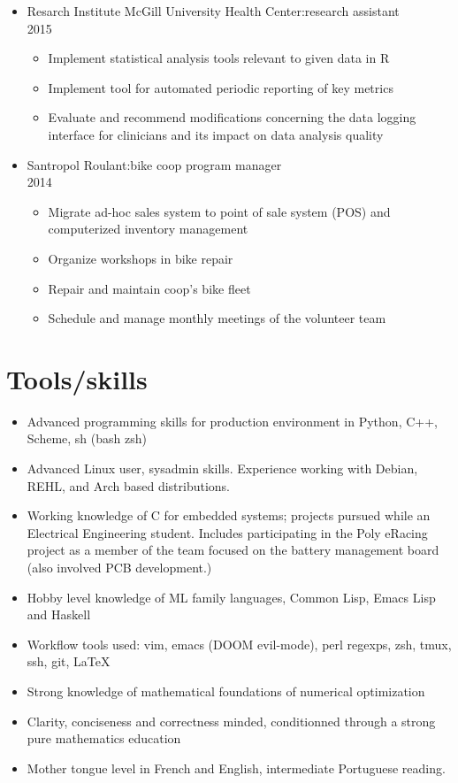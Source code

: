 \documentclass{article}
\begin{document}
\begin{itemize}
  \item Resarch Institute McGill University Health Center:\@ research assistant\\ 2015
    \begin{itemize}
      \item Implement statistical analysis tools relevant to given data in R
      \item Implement tool for automated periodic reporting of key metrics
      \item Evaluate and recommend modifications concerning the data logging
        interface for clinicians and its impact on data analysis quality
    \end{itemize}

  \item Santropol Roulant:\@ bike coop program manager\\ 2014
    \begin{itemize}
      \item Migrate ad-hoc sales system to point of sale system (POS) and computerized inventory management
      \item Organize workshops in bike repair
      \item Repair and maintain coop's bike fleet
      \item Schedule and manage monthly meetings of the volunteer team
    \end{itemize}

\end{itemize}

\section*{Tools/skills}
\begin{itemize}
  \item Advanced programming skills for production environment in Python, C++, Scheme, sh (bash zsh)
  \item Advanced Linux user, sysadmin skills.  Experience working with Debian, REHL, and Arch based distributions.
  \item Working knowledge of C for embedded systems; projects pursued while an Electrical Engineering student. Includes participating in the Poly eRacing project as a member of the team focused on the battery management board (also involved PCB development.)
  \item Hobby level knowledge of ML family languages, Common Lisp, Emacs Lisp and Haskell
  \item Workflow tools used: vim, emacs (DOOM evil-mode), perl regexps, zsh, tmux, ssh, git, \LaTeX
  \item Strong knowledge of mathematical foundations of numerical optimization
  \item Clarity, conciseness and correctness minded, conditionned through a strong pure mathematics education
  \item Mother tongue level in French and English, intermediate Portuguese reading.
\end{itemize}
\end{document}
